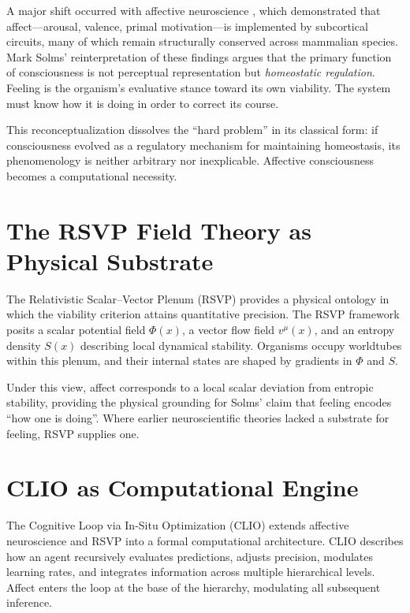 \documentclass[12pt,oneside]{book}
\theoremstyle{plain}
\theoremstyle{definition}
\let\citep\parencite
\begin{document}
A major shift occurred with affective neuroscience
\citep{panksepp1998affective}, which demonstrated that
affect—arousal, valence, primal motivation—is implemented by
subcortical circuits, many of which remain structurally conserved across
mammalian species.
Mark Solms’ reinterpretation of these findings
\citep{solms2021hidden}
argues that the primary function of consciousness is not perceptual
representation but \emph{homeostatic regulation}.
Feeling is the organism’s evaluative stance toward its own viability.
The system must know how it is doing in order to correct its course.

This reconceptualization dissolves the ``hard problem'' in its classical form:
if consciousness evolved as a regulatory mechanism for maintaining
homeostasis, its phenomenology is neither arbitrary nor inexplicable.
Affective consciousness becomes a computational necessity.

\section{The RSVP Field Theory as Physical Substrate}

The Relativistic Scalar--Vector Plenum (RSVP) provides a physical ontology
in which the viability criterion attains quantitative precision.
The RSVP framework posits a scalar potential field $\Phi(x)$,
a vector flow field $v^\mu(x)$, and an entropy density $S(x)$ describing
local dynamical stability.
Organisms occupy worldtubes within this plenum, and their internal states
are shaped by gradients in $\Phi$ and $S$.

Under this view, affect corresponds to a local scalar deviation from
entropic stability, providing the physical grounding for Solms’ claim
that feeling encodes ``how one is doing''.
Where earlier neuroscientific theories lacked a substrate for feeling,
RSVP supplies one.

\section{CLIO as Computational Engine}

The Cognitive Loop via In-Situ Optimization (CLIO)
\citep{cheng2025cognitive}
extends affective neuroscience and RSVP into a formal computational
architecture.
CLIO describes how an agent recursively evaluates predictions,
adjusts precision, modulates learning rates, and integrates information
across multiple hierarchical levels.
Affect enters the loop at the base of the hierarchy, modulating all
subsequent inference.
\end{document}
